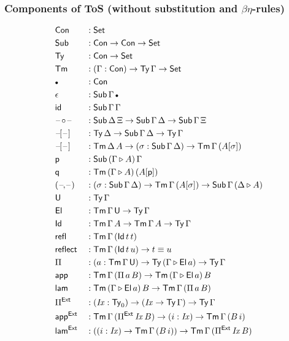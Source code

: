 \documentclass[12pt,a4paper,twoside,openany]{book}
\theoremstyle{remark}
\theoremstyle{definition}
\theoremstyle{theorem}
\newcommand{\mi}[1]{\mathit{#1}}
\newcommand{\ms}[1]{\mathsf{#1}}
\newcommand{\refl}{\mathsf{refl}}
\newcommand{\reflect}{\mathsf{reflect}}
\newcommand{\id}{\mathsf{id}}
\newcommand{\Con}{\mathsf{Con}}
\newcommand{\Sub}{\mathsf{Sub}}
\newcommand{\Tm}{\mathsf{Tm}}
\newcommand{\Ty}{\mathsf{Ty}}
\newcommand{\U}{\mathsf{U}}
\newcommand{\El}{\mathsf{El}}
\newcommand{\Id}{\mathsf{Id}}
\newcommand{\blank}{\mathord{\hspace{1pt}\text{--}\hspace{1pt}}}
\newcommand{\Set}{\mathsf{Set}}
\newcommand{\ext}{\triangleright}
\newcommand{\emptycon}{\scaleobj{.75}\bullet}
\newcommand{\Pie}{\Pi^{\mathsf{Ext}}}
\newcommand{\appe}{\mathsf{app^{Ext}}}
\newcommand{\lame}{\mathsf{lam^{Ext}}}
\newcommand{\p}{\mathsf{p}}
\newcommand{\q}{\mathsf{q}}
\newcommand{\app}{\ms{app}}
\newcommand{\lam}{\ms{lam}}
\begin{document}
\pagebreak

\subsubsection{Components of ToS (without substitution and $\beta\eta$-rules)}

\begin{alignat*}{3}
  &\Con &&: \Set\\
  &\Sub &&: \Con \to \Con \to \Set\\
  &\Ty  &&: \Con \to \Set\\
  &\Tm  &&: (\Gamma : \Con) \to \Ty\,\Gamma \to \Set \\
  &\emptycon &&: \Con\\
  &\epsilon &&: \Sub\,\Gamma\,\emptycon\\
  &\id &&: \Sub\,\Gamma\,\Gamma\\
  &\blank\!\circ\!\blank &&: \Sub\,\Delta\,\Xi \to \Sub\,\Gamma\,\Delta \to \Sub\,\Gamma\,\Xi\\
  &\blank\![\blank] &&: \Ty\,\Delta \to \Sub\,\Gamma\,\Delta \to \Ty\,\Gamma\\
  &\blank\![\blank] &&: \Tm\,\Delta\,A \to (\sigma : \Sub\,\Gamma\,\Delta) \to \Tm\,\Gamma\,(A[\sigma])\\
  &\p &&: \Sub\,(\Gamma\ext A)\,\Gamma\\
  &\q &&: \Tm\,(\Gamma\ext A)\,(A[\p])\\
  &(\blank\!,\!\blank) &&: (\sigma : \Sub\,\Gamma\,\Delta) \to \Tm\,\Gamma\,(A[\sigma]) \to \Sub\,\Gamma\,(\Delta\ext A)\\
  &\U &&: \Ty\,\Gamma\\
  &\El &&: \Tm\,\Gamma\,\U \to \Ty\,\Gamma\\
  &\Id &&: \Tm\,\Gamma\,A \to \Tm\,\Gamma\,A \to \Ty\,\Gamma\\
  &\refl &&: \Tm\,\Gamma\,(\Id\,t\,t)\\
  &\reflect &&: \Tm\,\Gamma\,(\Id\,t\,u) \to t \equiv u\\
  &\Pi &&: (a : \Tm\,\Gamma\,\U) \to \Ty\,(\Gamma\ext \El\,a) \to \Ty\,\Gamma\\
  &\app &&: \Tm\,\Gamma\,(\Pi\,a\,B) \to \Tm\,(\Gamma \ext \El\,a)\,B\\
  &\lam &&: \Tm\,(\Gamma \ext \El\,a)\,B \to \Tm\,\Gamma\,(\Pi\,a\,B)\\
  &\Pie &&: (\mi{Ix} : \Ty_0) \to (\mi{Ix} \to \Ty\,\Gamma) \to \Ty\,\Gamma\\
  &\appe &&: \Tm\,\Gamma\,(\Pie\,\mi{Ix}\,B) \to (i : \mi{Ix}) \to \Tm\,\Gamma\,(B\,i)\\
  &\lame &&: ((i : \mi{Ix}) \to \Tm\,\Gamma\,(B\,i)) \to \Tm\,\Gamma\,(\Pie\,\mi{Ix}\,B)
\end{alignat*}
\end{document}
